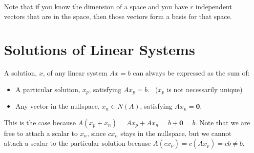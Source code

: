 \documentclass[11pt]{article}
\theoremstyle{plain}
\theoremstyle{definition}
\theoremstyle{remark}
\numberwithin{equation}{section}
\begin{document}
Note that if you know the dimension of a space and you have $r$ independent vectors that are in the space, then those vectors form a basis for that space.









\section{Solutions of Linear Systems}


A solution, $x$, of any linear system $A x = b$ can always be expressed as the sum of:
\begin{itemize}[noitemsep]
\item A particular solution, $x_p$, satisfying $A x_p = b$. \ ($x_p$ is not necessarily unique)
\item Any vector in the nullspace, $x_n \in N(A)$, satisfying $A x_n = \mathbf{0}$. 
\end{itemize}

This is the case because $A (x_p + x_n) = A x_p + A x_n = b + \mathbf{0} = b$. Note that we are free to attach a scalar to $x_n$, since $c x_n$ stays in the nullspace, but we cannot attach a scalar to the particular solution because $A (c x_p) = c (A x_p) = c b \neq b$. 
\\
\end{document}
